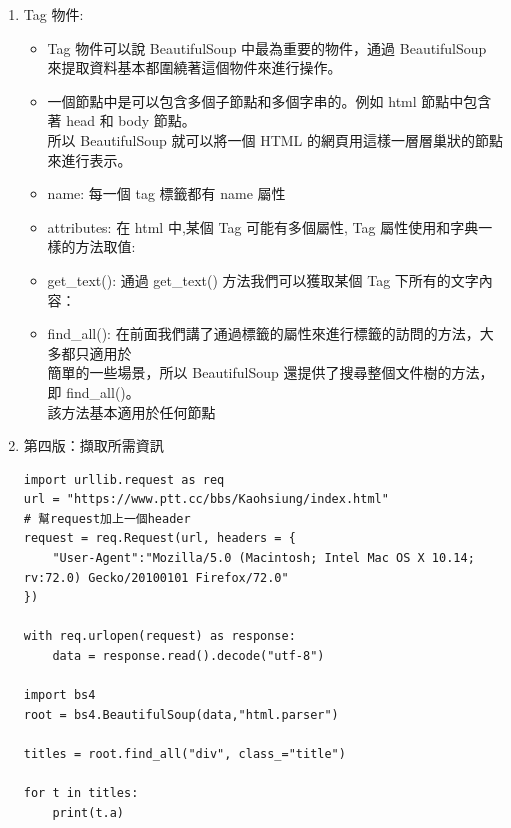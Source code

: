 \documentclass[a4paper,12pt]{article}
\begin{document}
\begin{enumerate}
\begin{enumerate}
\begin{itemize}
\item BeautifulSoup: BeautifulSoup 物件就是通過解析網頁所得到的物件，我們的 soup 即\\
是 BeautifulSoup 物件. 可以把它當作 Tag 物件，是一個特殊的 Tag，我們可以分別獲取它的型別，名稱，以及屬性\\
\item Comment: 物件是網頁中的註釋及特殊字串，當你提取網頁中的註釋的時候，它會自動幫你生成 Comment 物件\\
\end{itemize}
\item Tag 物件:
\label{sec:org3de55b9}
\begin{itemize}
\item Tag 物件可以說 BeautifulSoup 中最為重要的物件，通過 BeautifulSoup 來提取資料基本都圍繞著這個物件來進行操作。\\
\item 一個節點中是可以包含多個子節點和多個字串的。例如 html 節點中包含著 head 和 body 節點。\\
所以 BeautifulSoup 就可以將一個 HTML 的網頁用這樣一層層巢狀的節點來進行表示。\\
\item name: 每一個 tag 標籤都有 name 屬性\\
\item attributes: 在 html 中,某個 Tag 可能有多個屬性, Tag 屬性使用和字典一樣的方法取值:\\
\item get\_text(): 通過 get\_text() 方法我們可以獲取某個 Tag 下所有的文字內容：\\
\item find\_all(): 在前面我們講了通過標籤的屬性來進行標籤的訪問的方法，大多都只適用於\\
簡單的一些場景，所以 BeautifulSoup 還提供了搜尋整個文件樹的方法，即 find\_all()。\\
該方法基本適用於任何節點\\
\end{itemize}
\item 第四版：擷取所需資訊
\label{sec:org7dfaa15}
\lstset{breaklines=true,language=Python,label= ,caption= ,captionpos=b,firstnumber=1,numbers=left}
\begin{lstlisting}
import urllib.request as req
url = "https://www.ptt.cc/bbs/Kaohsiung/index.html"
# 幫request加上一個header
request = req.Request(url, headers = {
    "User-Agent":"Mozilla/5.0 (Macintosh; Intel Mac OS X 10.14; rv:72.0) Gecko/20100101 Firefox/72.0"
})

with req.urlopen(request) as response:
    data = response.read().decode("utf-8")

import bs4
root = bs4.BeautifulSoup(data,"html.parser")

titles = root.find_all("div", class_="title")

for t in titles:
    print(t.a)

\end{lstlisting}
\end{enumerate}
\end{enumerate}
\end{document}
